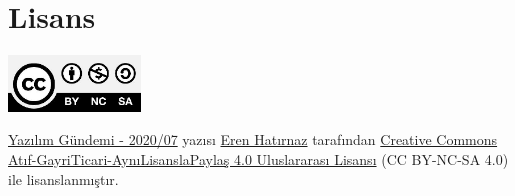 \documentclass[11pt]{article}
\begin{document}
\section{Lisans}
\label{sec:org752b4b5}
\begin{center}
\begin{center}
\includegraphics[height=1.5cm]{../../../img/CC_BY-NC-SA_4.0.png}
\end{center}

\href{yazilim-gundemi-2020-07.pdf}{Yazılım Gündemi - 2020/07} yazısı \href{https://erenhatirnaz.github.io}{Eren Hatırnaz} tarafından \href{http://creativecommons.org/licenses/by-nc-sa/4.0/}{Creative Commons
Atıf-GayriTicari-AynıLisanslaPaylaş 4.0 Uluslararası Lisansı} (CC BY-NC-SA 4.0)
ile lisanslanmıştır.
\end{center}
\end{document}

